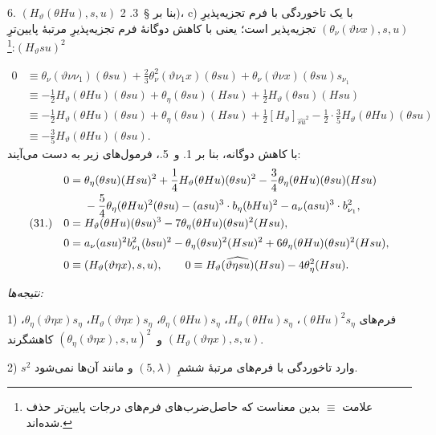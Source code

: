\documentclass[11pt]{article}
\newcommand{\srcLTR}[1]{\relax\ifmmode\text{\mbox{\babelsublr{\foreignlanguage{english}{#1}}}}\else\babelsublr{\foreignlanguage{english}{#1}}\fi}
\newcommand{\srcfn}[2]{\begingroup\renewcommand{\thefootnote}{\srcLTR{#1}}\footnote{#2}\addtocounter{footnote}{-1}\endgroup}
\begin{document}
6. $(H_\vartheta(\theta Hu),s,u)$ بنا بر \S\ 3. 2)، c) با یک تاخوردگی با فرم تجزیه‌پذیرِ $(\theta_\nu(\vartheta \nu x),s,u)$ تجزیه‌پذیر است؛ یعنی با کاهش دوگانهٔ فرم تجزیه‌پذیرِ مرتبهٔ پایین‌ترِ $(H_\vartheta su)^2$:\srcfn{*)}{علامت $\equiv$ بدین معناست که حاصل‌ضرب‌های فرم‌های درجات پایین‌تر حذف شده‌اند.}
\[
\begin{aligned}
0&\equiv \theta_\nu(\vartheta\nu\nu_1)(\theta su)+\frac23\theta_\nu^2(\vartheta \nu_1 x)(\theta su)+\theta_\nu(\vartheta \nu x)(\theta su)s_{\nu_1}\\
&\equiv -\frac12H_\vartheta(\theta Hu)(\theta su)+\theta_\eta(\theta su)(Hsu)+\frac12H_\vartheta(\theta su)(Hsu)\\
&\equiv -\frac12H_\vartheta(\theta Hu)(\theta su)+\theta_\eta(\theta su)(Hsu)+\frac12[H_\vartheta]_{\widehat{su}^2}-\frac12\cdot\frac35H_\vartheta(\theta Hu)(\theta su)\\
&\equiv -\frac35H_\vartheta(\theta Hu)(\theta su).
\end{aligned}
\]
با کاهش دوگانه، بنا بر 1. و~5.، فرمول‌های زیر به دست می‌آیند:
\[
\begin{array}{@{}r@{\quad}l@{}}
&\displaystyle
\begin{aligned}
0={}&\theta_\eta(\theta su)(Hsu)^2+\frac14H_\vartheta(\theta Hu)(\theta su)^2-\frac34\theta_\eta(\theta Hu)(\theta su)(Hsu)\\
&-\frac54\theta_\eta(\theta Hu)^2(\theta su)-(asu)^3\cdot b_\eta(bHu)^2-a_\nu(asu)^3\cdot b_{\nu_1}^2,
\end{aligned}\\[0.55em]
(31.)&\displaystyle 0=H_\vartheta(\theta Hu)(\theta su)^3-7\theta_\eta(\theta Hu)(\theta su)^2(Hsu),\\[0.55em]
&\displaystyle 0=a_\nu(asu)^2b_{\nu_1}^{2}(bsu)^2-\theta_\eta(\theta su)^2(Hsu)^2+6\theta_\eta(\theta Hu)(\theta su)^2(Hsu),\\[0.55em]
&\displaystyle 0\equiv (H_\vartheta(\vartheta\eta x),s,u),\qquad
0\equiv H_\vartheta(\widehat{\vartheta\eta su})(Hsu)-4\theta_\eta^2(Hsu).
\end{array}
\]

\noindent\emph{نتیجه‌ها:}

1) فرم‌های $(\theta Hu)^2s_\eta$، $H_\vartheta(\theta Hu)s_\eta$، $\theta_\eta(\theta Hu)s_\eta$، $H_\vartheta(\vartheta\eta x)s_\eta$، $\theta_\eta(\vartheta\eta x)s_\eta$، $(H_\vartheta(\vartheta\eta x),s,u)$ و~$(\theta_\eta(\vartheta\eta x),s,u)^2$ کاهشگرند.

2) $s^2$ وارد تاخوردگی با فرم‌های مرتبهٔ ششمِ $(5,\lambda)$ و مانند آن‌ها نمی‌شود.
\end{document}
